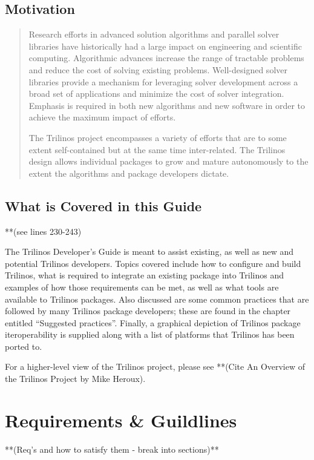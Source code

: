 \documentclass[12pt,relax]{TrilinosDevGuide}
\begin{document}
	\section{Motivation}
	\begin{quote}
Research efforts in advanced solution algorithms and parallel solver
libraries have historically had a large impact on engineering and
scientific computing.  Algorithmic advances increase the range
of tractable problems and reduce the cost of solving existing
problems.  Well-designed solver libraries provide a mechanism for
leveraging solver development across a broad set of applications and
minimize the cost of solver integration.  Emphasis is
required in both new algorithms and new software in order
to achieve the maximum impact of efforts.

The Trilinos project encompasses a variety of efforts that are to some
extent self-contained but at the same time inter-related.  The
Trilinos design allows individual packages to grow and mature
autonomously to the extent the algorithms and package developers
dictate. 
	\end{quote}

	\section{What is Covered in this Guide}
**(see lines 230-243)

The Trilinos Developer's Guide is meant to assist existing, as well as new and
potential Trilinos developers.  Topics covered include how to configure and 
build Trilinos, what is required to integrate an existing package into Trilinos
and examples of how those requirements can be met, as well as what tools are 
available to Trilinos packages.  Also discussed are some common practices that 
are followed by many Trilinos package developers; these are found in the 
chapter entitled ``Suggested practices''.  Finally, a graphical depiction of 
Trilinos package iteroperability is supplied along with a list of platforms 
that Trilinos has been ported to.

For a higher-level view of the Trilinos project, please see **(Cite An Overview
of the Trilinos Project by Mike Heroux). 


	\chapter{Requirements \& Guildlines}
	**(Req's and how to satisfy them - break into sections)**
\end{document}
